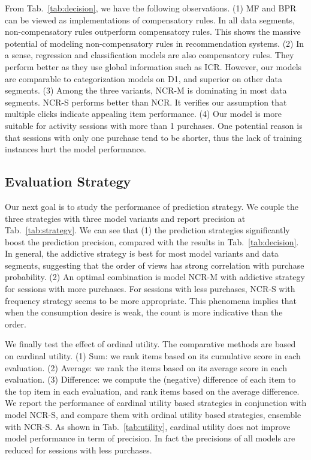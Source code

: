 \documentclass[sigconf]{acmart}
\begin{document}
From Tab.~\ref{tab:decision}, we have the following observations. (1) MF and BPR can be viewed as implementations of compensatory rules. In all data segments, non-compensatory rules outperform compensatory rules. This shows the massive potential of modeling non-compensatory rules in recommendation systems. (2) In a sense, regression and classification models are also compensatory rules. They perform better as they use global information such as ICR. However, our models are comparable to categorization models on D1, and superior on other data segments. (3) Among the three variants, NCR-M is dominating in most data segments. NCR-S performs better than NCR. It verifies our assumption that multiple clicks indicate appealing item performance. (4) Our model is more suitable for activity sessions with more than 1 purchases. One potential reason is that sessions with only one purchase tend to be shorter, thus the lack of training instances hurt the model performance.  



\subsection{Evaluation Strategy}


Our next goal is to study the performance of prediction strategy. We couple the three strategies with three model variants and report precision at Tab.~\ref{tab:strategy}. We can see that (1) the prediction strategies significantly boost the prediction precision, compared with the results in Tab.~\ref{tab:decision}. In general, the addictive strategy is best for most model variants and data segments, suggesting that the order of views has strong correlation with purchase probability.  (2) An optimal combination is model NCR-M with addictive strategy for sessions with more purchases. For sessions with less purchases, NCR-S with frequency strategy seems to be more appropriate. This phenomena implies that when the consumption desire is weak, the count is more indicative than the order. 

We finally test the effect of ordinal utility. The comparative methods are based on  cardinal utility. (1) Sum: we rank items based on its cumulative score in each evaluation. (2) Average: we rank the items based on its average score in each evaluation. (3) Difference: we compute the (negative) difference of each item to the top item in each evaluation, and rank items based on the average difference. We report the performance of cardinal utility based strategies in conjunction with model NCR-S, and compare them with ordinal utility based strategies, ensemble with NCR-S. As shown in Tab.~\ref{tab:utility}, cardinal utility does not improve model performance in term of precision. In fact the precisions of all models are reduced for sessions with less purchases. 
\end{document}
